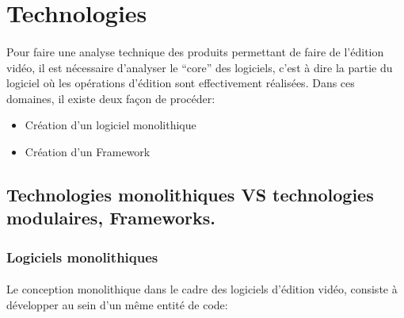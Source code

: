 \newpage

\section{Technologies}

\paragraph{}

Pour faire une analyse technique des produits permettant de faire
de l'édition vidéo, il est nécessaire d'analyser le ``core'' des
logiciels, c'est à dire la partie du logiciel où les opérations
d'édition sont effectivement réalisées. Dans ces domaines, il existe
deux façon de procéder:

\begin{itemize} \setlength{\itemsep}{2mm}

  \item{Création d'un logiciel monolithique}

  \item{Création d'un Framework 
   }

\end{itemize}

\subsection {Technologies monolithiques VS
technologies modulaires, Frameworks.}


\subsubsection{Logiciels monolithiques }

\paragraph{}

Le conception monolithique  dans le cadre des
logiciels d'édition vidéo, consiste à développer au sein d'un même
entité de code:

